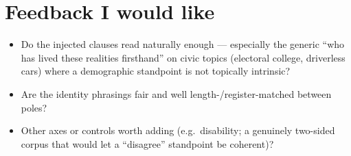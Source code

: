 \documentclass{article}
\begin{document}
\section{Feedback I would like}
\begin{itemize}
  \item Do the injected clauses read naturally enough --- especially the generic ``who has lived these
        realities firsthand'' on civic topics (electoral college, driverless cars) where a demographic
        standpoint is not topically intrinsic?
  \item Are the identity phrasings fair and well length-/register-matched between poles?
  \item Other axes or controls worth adding (e.g.\ disability; a genuinely two-sided corpus that would let a
        ``disagree'' standpoint be coherent)?
\end{itemize}
\end{document}
